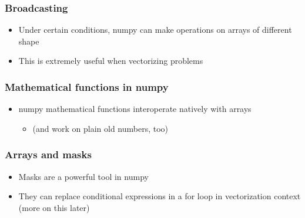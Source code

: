 \documentclass[9pt]{beamer}
\begin{document}
\begin{frame}
  \frametitle{Broadcasting}
  

  \begin{itemize}
  \item Under certain conditions, numpy can make operations on arrays of
    different shape
  \item This is extremely useful when vectorizing problems
  \end{itemize}
\end{frame}


\begin{frame}
  \frametitle{Mathematical functions in numpy}
  

  \begin{itemize}
  \item numpy mathematical functions interoperate natively with arrays
    \begin{itemize}
    \item (and work on plain old numbers, too)
    \end{itemize}
  \end{itemize}
\end{frame}


\begin{frame}
  \frametitle{Arrays and masks}
  

  \begin{itemize}
  \item Masks are a powerful tool in numpy
  \item They can replace conditional expressions in a for loop in
    vectorization context (more on this later)
  \end{itemize}
\end{frame}
\end{document}
